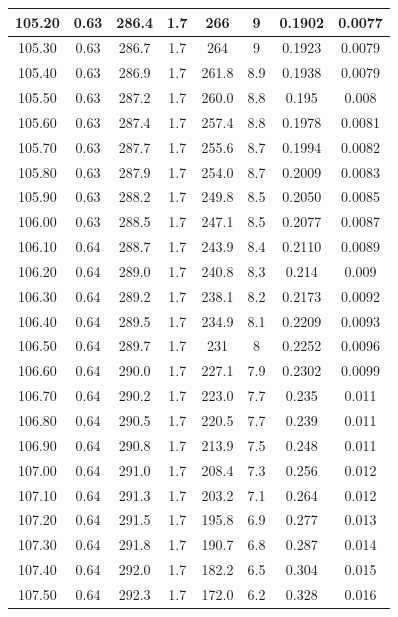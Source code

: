 \documentclass[12pt, a4paper, oneside]{article}
\begin{document}
\begin{longtable}[h]{|c|c|c|c|c|c|c|c|}
    105.20 & 0.63 & 286.4 & 1.7 & 266 & 9 & 0.1902 & 0.0077 \\\hline
    105.30 & 0.63 & 286.7 & 1.7 & 264 & 9 & 0.1923 & 0.0079 \\\hline
    105.40 & 0.63 & 286.9 & 1.7 & 261.8 & 8.9 & 0.1938 & 0.0079 \\\hline
    105.50 & 0.63 & 287.2 & 1.7 & 260.0 & 8.8 & 0.195 & 0.008 \\\hline
    105.60 & 0.63 & 287.4 & 1.7 & 257.4 & 8.8 & 0.1978 & 0.0081 \\\hline
    105.70 & 0.63 & 287.7 & 1.7 & 255.6 & 8.7 & 0.1994 & 0.0082 \\\hline
    105.80 & 0.63 & 287.9 & 1.7 & 254.0 & 8.7 & 0.2009 & 0.0083 \\\hline
    105.90 & 0.63 & 288.2 & 1.7 & 249.8 & 8.5 & 0.2050 & 0.0085 \\\hline
    106.00 & 0.63 & 288.5 & 1.7 & 247.1 & 8.5 & 0.2077 & 0.0087 \\\hline
    106.10 & 0.64 & 288.7 & 1.7 & 243.9 & 8.4 & 0.2110 & 0.0089 \\\hline
    106.20 & 0.64 & 289.0 & 1.7 & 240.8 & 8.3 & 0.214 & 0.009 \\\hline
    106.30 & 0.64 & 289.2 & 1.7 & 238.1 & 8.2 & 0.2173 & 0.0092 \\\hline
    106.40 & 0.64 & 289.5 & 1.7 & 234.9 & 8.1 & 0.2209 & 0.0093 \\\hline
    106.50 & 0.64 & 289.7 & 1.7 & 231 & 8 & 0.2252 & 0.0096 \\\hline
    106.60 & 0.64 & 290.0 & 1.7 & 227.1 & 7.9 & 0.2302 & 0.0099 \\\hline
    106.70 & 0.64 & 290.2 & 1.7 & 223.0 & 7.7 & 0.235 & 0.011 \\\hline
    106.80 & 0.64 & 290.5 & 1.7 & 220.5 & 7.7 & 0.239 & 0.011 \\\hline
    106.90 & 0.64 & 290.8 & 1.7 & 213.9 & 7.5 & 0.248 & 0.011 \\\hline
    107.00 & 0.64 & 291.0 & 1.7 & 208.4 & 7.3 & 0.256 & 0.012 \\\hline
    107.10 & 0.64 & 291.3 & 1.7 & 203.2 & 7.1 & 0.264 & 0.012 \\\hline
    107.20 & 0.64 & 291.5 & 1.7 & 195.8 & 6.9 & 0.277 & 0.013 \\\hline
    107.30 & 0.64 & 291.8 & 1.7 & 190.7 & 6.8 & 0.287 & 0.014 \\\hline
    107.40 & 0.64 & 292.0 & 1.7 & 182.2 & 6.5 & 0.304 & 0.015 \\\hline
    107.50 & 0.64 & 292.3 & 1.7 & 172.0 & 6.2 & 0.328 & 0.016 \\\hline

\end{longtable}
\end{document}
